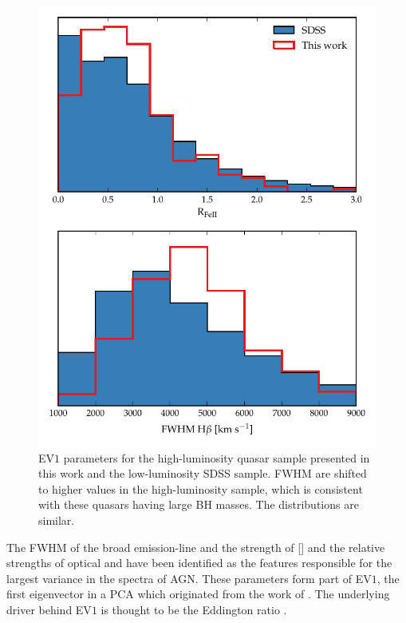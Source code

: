 \begin{figure}[t!]
\centering 
    \includegraphics[width=\columnwidth]{figures/chapter04/ev1_hists.pdf} 
    \caption[{}]{EV$1$ parameters for the high-luminosity quasar sample presented in this work and the low-luminosity SDSS sample. \hb FWHM are shifted to higher values in the high-luminosity sample, which is consistent with these quasars having large BH masses. The  distributions are similar.}      
    \label{fig:ev1_hists}
\end{figure}


The FWHM of the broad \hb emission-line and the strength of [] and the relative strengths of optical  and \hb have been identified as the features responsible for the largest variance in the spectra of AGN.
These parameters form part of EV$1$, the first eigenvector in a PCA which originated from the work of \citet{boroson92}.   
The underlying driver behind EV$1$ is thought to be the Eddington ratio \citep[e.g.][]{sulentic00b,shen14}.

